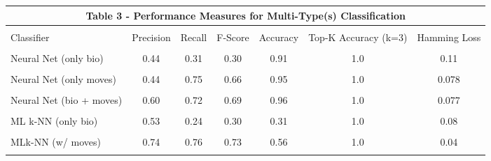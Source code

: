\documentclass{winnower}
\begin{document}
\begin{center}
\begin{tabular}{lcccccc} \multicolumn{7}{c}{Table 3 - Performance Measures for Multi-Type(s) Classification} \\ \hline
& & & & & & \\
Classifier & Precision & Recall & F-Score & Accuracy & Top-K Accuracy (k=3) & Hamming Loss \\ \hline
& & & & & & \\
Neural Net (only bio) & 0.44 & 0.31 & 0.30 & 0.91 & 1.0 & 0.11 \\
& & & & & & \\
Neural Net (only moves) & 0.44 & 0.75 & 0.66 & 0.95 & 1.0 & 0.078 \\
& & & & & & \\
Neural Net (bio +  moves) & 0.60 & 0.72 & 0.69 & 0.96 & 1.0 & 0.077 \\
& & & & & & \\
ML k-NN (only bio) & 0.53 & 0.24 & 0.30 & 0.31 & 1.0 & 0.08 \\
& & & & & & \\
MLk-NN (w/ moves) & 0.74 & 0.76 & 0.73 & 0.56 & 1.0 & 0.04 \\
& & & & & & \\ \hline
\end{tabular}
\end{center}



% 
% 

\end{document}
